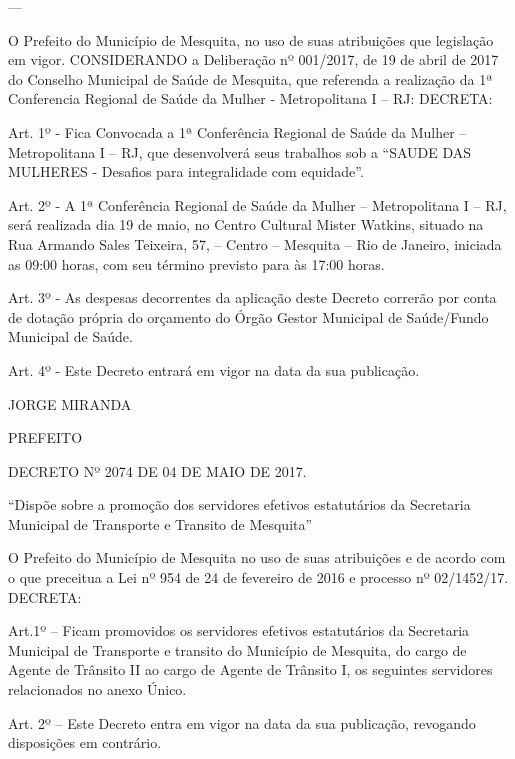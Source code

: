 \documentclass{doliberto}
\begin{document}
---

O  Prefeito  do  Município  de  Mesquita,  no  uso  de  suas 
atribuições  que 
legislação  em  vigor. 
CONSIDERANDO a Deliberação nº 001/2017, de 19 de abril 
de 2017 do Conselho Municipal de Saúde de Mesquita, que 
referenda a realização da 1ª Conferencia Regional de Saúde 
da Mulher - Metropolitana I – RJ: 
DECRETA:  
 
Art. 1º - Fica Convocada a 1ª Conferência Regional de Saúde 
da  Mulher  –  Metropolitana  I  –  RJ,  que  desenvolverá  seus 
trabalhos  sob  a 
  “SAUDE  DAS 
MULHERES - Desafios para integralidade com equidade”.  
 
Art.  2º  -  A  1ª  Conferência  Regional  de  Saúde  da  Mulher  – 
Metropolitana I – RJ, será realizada dia 19 de maio, no Centro 
Cultural  Mister  Watkins,  situado  na  Rua  Armando  Sales 
Teixeira, 57, – Centro – Mesquita – Rio de Janeiro, iniciada as 
09:00 horas, com seu término previsto para às 17:00 horas.  
 
 Art. 3º - As despesas decorrentes da aplicação deste Decreto 
correrão  por  conta  de  dotação  própria  do  orçamento  do 
Órgão  Gestor  Municipal  de  Saúde/Fundo  Municipal  de 
Saúde.  
 
Art.  4º  -  Este  Decreto  entrará  em  vigor  na  data  da  sua 
publicação.  
 

JORGE MIRANDA 

PREFEITO 

 
 

 

DECRETO Nº 2074 DE 04 DE MAIO DE 2017. 

 

 

                                         “Dispõe 
sobre  a  promoção  dos 
servidores efetivos estatutários da Secretaria Municipal de 
Transporte e Transito de Mesquita” 
 

    O  Prefeito  do  Município  de  Mesquita  no  uso  de  suas 
atribuições e de acordo com o que preceitua a Lei nº 954 de 
24 de fevereiro de 2016 e processo nº 02/1452/17. 
    DECRETA: 
 
Art.1º  –  Ficam  promovidos  os  servidores  efetivos 
estatutários  da  Secretaria  Municipal  de  Transporte  e 
transito do Município de Mesquita, do cargo de Agente de 
Trânsito II ao cargo de Agente de Trânsito I, os seguintes 
servidores relacionados no anexo Único. 
 
Art.  2º  –  Este  Decreto  entra  em  vigor  na  data  da  sua 
publicação, revogando disposições em contrário. 
 
\end{document}
